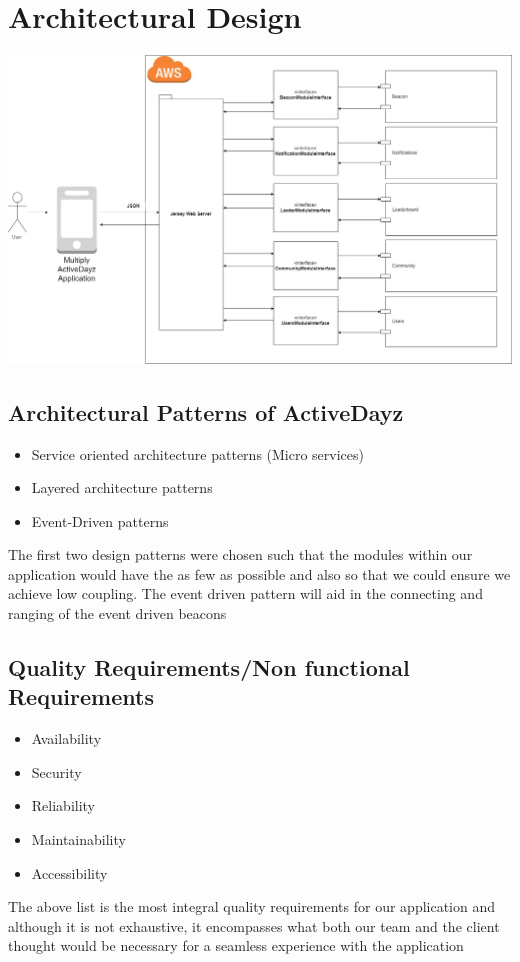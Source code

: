 \documentclass[11pt]{article}
\begin{document}
\section{Architectural Design}
\includegraphics[width=0.7\linewidth]{images/Integration.jpg}\\[1cm]
\subsection{Architectural Patterns of ActiveDayz}
\begin{itemize}
\item Service oriented architecture patterns (Micro services)
\item Layered architecture patterns
\item Event-Driven patterns
\end{itemize}
The first two design patterns were chosen such that the modules within our application would have the as few as possible and also so that we could ensure we achieve low coupling. The event driven pattern will aid in the connecting and ranging of the event driven beacons

\subsection{Quality Requirements/Non functional Requirements}
\begin{itemize}
\item Availability
\item Security
\item Reliability
\item Maintainability
\item Accessibility
\end{itemize}
The above list is the most integral quality requirements for our application and although it is not exhaustive, it encompasses what both our team and the client thought would be necessary for a seamless experience with the application
\end{document}
